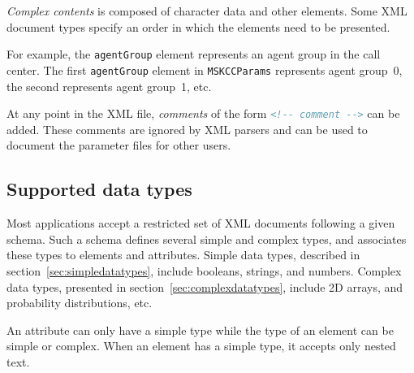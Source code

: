 \emph{Complex contents} is composed of character data and
other elements.  Some XML document types specify an order in which the
elements need to be presented.

For example, the \texttt{agent\-Group} element
represents an agent group
in the call center.  The first \texttt{agent\-Group} element in
\texttt{MSKCCParams} represents agent group~0, the second represents
agent group~1, etc.

At any point in the XML file, \emph{comments} of the form
\lstinline[language=XML]{<!-- comment -->} can be added.  These
comments are ignored by XML
parsers and can be used to document the parameter files for other
users.


\subsection{Supported data types}
\label{sec:datatypes}

Most applications accept a restricted set of XML documents following a
given schema. Such a schema defines several simple and complex types,
and associates these types to elements and attributes.
Simple data types, described in
section~\ref{sec:simpledatatypes},
include booleans, strings, and
numbers.  Complex data types, presented in
section~\ref{sec:complexdatatypes},
include 2D arrays, and probability
distributions, etc.

An attribute can only have a simple type while the type of an
element can be simple or complex.
When an element has a simple type, it accepts only nested text.

